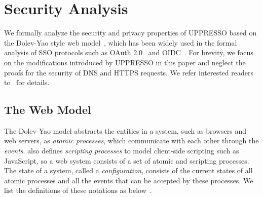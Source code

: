 \section{Security Analysis}
\label{sec:formal}

We formally analyze the security and privacy properties of UPPRESSO based on the Dolev-Yao style web model~\cite{SPRESSO}, which has been widely used in the formal analysis of SSO protocols such as OAuth 2.0~\cite{FettKS16} and OIDC~\cite{FettKS17}. For brevity, we focus on the modifications introduced by UPPRESSO in this paper and neglect the proofs for the security of DNS and HTTPS requests. We refer interested readers to~\cite{SPRESSO} for details.

\subsection{The Web Model}
\label{subsec:webmodel}
The Dolev-Yao model abstracts the entities in a system, such as browsers and web servers, as {\em atomic processes}, which communicate with each other through the {\em events}. \cite{SPRESSO} also defines {\em scripting processes} to model client-side scripting such as JavaScript, so a web system consists of a set of atomic and scripting processes. The state of a system, called a {\em configuration}, consists of the current states of all atomic processes and all the events that can be accepted by these processes. We list the definitions of these notations as below~\cite{SPRESSO}.

